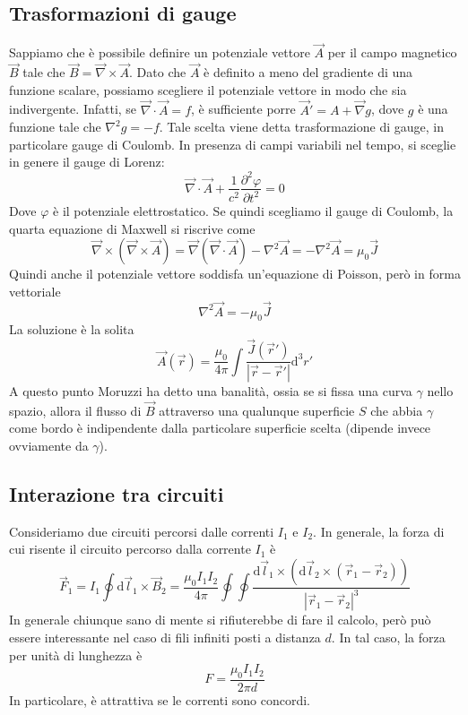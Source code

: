 \documentclass[a4paper,11pt]{book}
\let\oldnabla\nabla
\renewcommand{\nabla}{\vec{\oldnabla}}
\newcommand{\der}[3][]{\frac{\partial ^{#1}#2}{\partial #3^{#1}}}
\newcommand{\dif}{\mathrm{d}}
\newcommand{\lap}{\oldnabla^2}
\theoremstyle{definition}
\theoremstyle{theorem}
\begin{document}
\subsection{Trasformazioni di gauge}
Sappiamo che è possibile definire un potenziale vettore $\vec{A}$ per il campo magnetico $\vec{B}$ tale che $\vec{B}=\nabla\times\vec{A}$. Dato che $\vec{A}$ è definito a meno del gradiente di una funzione scalare, possiamo scegliere il potenziale vettore in modo che sia indivergente. Infatti, se $\nabla\cdot\vec{A}=f$, è sufficiente porre $\vec{A}'=A+\nabla g$, dove $g$ è una funzione tale che $\lap g=-f$. Tale scelta viene detta trasformazione di gauge, in particolare gauge di Coulomb. In presenza di campi variabili nel tempo, si sceglie in genere il gauge di Lorenz:
\[\nabla\cdot\vec{A}+\frac{1}{c^2}\der[2]{\varphi}{t}=0\]
Dove $\varphi$ è il potenziale elettrostatico. Se quindi scegliamo il gauge di Coulomb, la quarta equazione di Maxwell si riscrive come
\[\nabla\times(\nabla\times\vec{A})=\nabla(\nabla\cdot\vec{A})-\lap\vec{A}=-\lap\vec{A}=\mu_0\vec{J}\]
Quindi anche il potenziale vettore soddisfa un'equazione di Poisson, però in forma vettoriale
\[\lap\vec{A}=-\mu_0\vec{J}\]
La soluzione è la solita
\[\vec{A}(\vec{r})=\frac{\mu_0}{4\pi}\int\frac{\vec{J}(\vec{r}')}{|\vec{r}-\vec{r}'|}\dif^3r'\]
A questo punto Moruzzi ha detto una banalità, ossia se si fissa una curva $\gamma$ nello spazio, allora il flusso di $\vec{B}$ attraverso una qualunque superficie $S$ che abbia $\gamma$ come bordo è indipendente dalla particolare superficie scelta (dipende invece ovviamente da $\gamma$).
\subsection{Interazione tra circuiti}
Consideriamo due circuiti percorsi dalle correnti $I_1$ e $I_2$. In generale, la forza di cui risente il circuito percorso dalla corrente $I_1$ è
\[\vec{F}_1=I_1\oint\dif\vec{l}_1\times\vec{B}_2=\frac{\mu_0I_1I_2}{4\pi}\oint\oint\frac{\dif\vec{l}_1\times\left(\dif\vec{l}_2\times(\vec{r}_1-\vec{r}_2)\right)}{|\vec{r}_1-\vec{r}_2|^3}\]
In generale chiunque sano di mente si rifiuterebbe di fare il calcolo, però può essere interessante nel caso di fili infiniti posti a distanza $d$. In tal caso, la forza per unità di lunghezza è
\[F=\frac{\mu_0I_1I_2}{2\pi d}\]
In particolare, è attrattiva se le correnti sono concordi.
\end{document}
